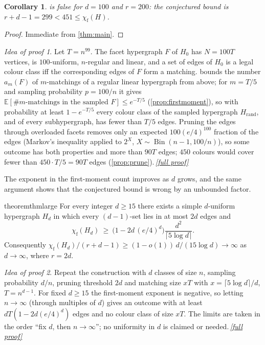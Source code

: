 \documentclass[11pt,a4paper]{article}
\theoremstyle{plain}
\newtheorem{corollary}[theorem]{Corollary}
\theoremstyle{definition}
\theoremstyle{remark}
\newtheorem*{proofidea}{Idea of proof}
\newcommand{\fullproofref}[1]{\,\hyperref[#1]{\textit{[full proof]}}}
\newcommand{\E}{\mathbb E}
\newcommand{\chif}{\chi_{\mathrm{f}}}
\newcommand{\Hrand}{H_{\mathrm{rand}}}
\DeclareMathOperator{\Bin}{Bin}
\begin{document}
\begin{corollary}\label{cor:main}
 is false for $d=100$ and $r=200$: the conjectured bound is $r+d-1=299<451\le\chif(H)$.
\end{corollary}
\begin{proof}
Immediate from \cref{thm:main}.
\end{proof}

\begin{proofidea}
Let $T=n^{99}$. The facet hypergraph $F$ of $H_0$ has $N=100T$ vertices, is $100$-uniform, $n$-regular and linear, and a set of edges of $H_0$ is a legal colour class iff the corresponding edges of $F$ form a matching.  bounds the number $a_m(F)$ of $m$-matchings of a regular linear hypergraph from above; for $m=T/5$ and sampling probability $p=100/n$ it gives $\E[\#\text{$m$-matchings in the sampled $F$}]\le e^{-T/5}$ (\cref{prop:firstmoment}), so with probability at least $1-e^{-T/5}$ every colour class of the sampled hypergraph $\Hrand$, and of every subhypergraph, has fewer than $T/5$ edges. Pruning the edges through overloaded facets removes only an expected $100(e/4)^{100}$ fraction of the edges (Markov's inequality applied to $2^{X}$, $X\sim\Bin(n-1,100/n)$), so some outcome has both properties and more than $90T$ edges; $450$ colours would cover fewer than $450\cdot T/5=90T$ edges (\cref{prop:prune}).\fullproofref{pf:main}
\end{proofidea}

The exponent in the first-moment count improves as $d$ grows, and the same argument shows that the conjectured bound is wrong by an unbounded factor.

\begin{restatable}{theorem}{thmlarge}\label{thm:large}
For every integer $d\ge15$ there exists a simple $d$-uniform hypergraph $H_d$ in which every $(d-1)$-set lies in at most $2d$ edges and
\[
\chif(H_d)\ \ge\ \bigl(1-2d\,(e/4)^{d}\bigr)\frac{d^2}{\lceil5\log d\rceil}.
\]
Consequently $\chif(H_d)/(r+d-1)\ge(1-o(1))\,d/(15\log d)\to\infty$ as $d\to\infty$, where $r=2d$.
\end{restatable}

\begin{proofidea}
Repeat the construction with $d$ classes of size $n$, sampling probability $d/n$, pruning threshold $2d$ and matching size $xT$ with $x=\lceil5\log d\rceil/d$, $T=n^{d-1}$. For fixed $d\ge15$ the first-moment exponent is negative, so letting $n\to\infty$ (through multiples of $d$) gives an outcome with at least $dT(1-2d(e/4)^d)$ edges and no colour class of size $xT$. The limits are taken in the order ``fix $d$, then $n\to\infty$''; no uniformity in $d$ is claimed or needed.\fullproofref{pf:large}
\end{proofidea}
\end{document}
